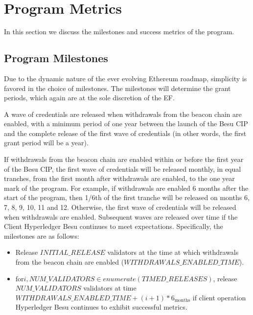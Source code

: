 
\section{Program Metrics} \label{sec:metrics}
In this section we discuss the milestones and success metrics of the program.

\subsection{Program Milestones}
Due to the dynamic nature of the ever evolving Ethereum roadmap, simplicity is favored in the choice of milestones.  The milestones will determine the grant periods, which again are at the sole discretion of the EF.

A wave of credentials are released when withdrawals from the beacon chain are enabled, with a minimum period of one year between the launch of the Besu CIP and the complete release of the first wave of credentials (in other words, the first grant period will be a year).

If withdrawals from the beacon chain are enabled within or before the first year of the Besu CIP, the first wave of credentials will be released monthly, in equal tranches, from the first month after withdrawals are enabled, to the one year mark of the program. For example, if withdrawals are enabled 6 months after the start of the program, then 1/6th of the first tranche will be released on months 6, 7, 8, 9, 10, 11 and 12. Otherwise, the first wave of credentials will be released when withdrawals are enabled. Subsequent waves are released over time if the Client Hyperledger Besu continues to meet expectations. Specifically, the milestones are as follows:

\begin{itemize}
\item Release $INITIAL\_RELEASE$ validators at the time at which withdrawals from the beacon chain are enabled ($WITHDRAWALS\_ENABLED\_TIME$).
\item $\text{for} i, NUM\_VALIDATORS \in enumerate \left(TIMED\_RELEASES \right)$, release $NUM\_VALIDATORS$ validators at time $WITHDRAWALS\_ENABLED\_TIME + (i + 1) * 6_{\text{months}}$ if client operation Hyperledger Besu continues to exhibit successful metrics.
\end{itemize}
